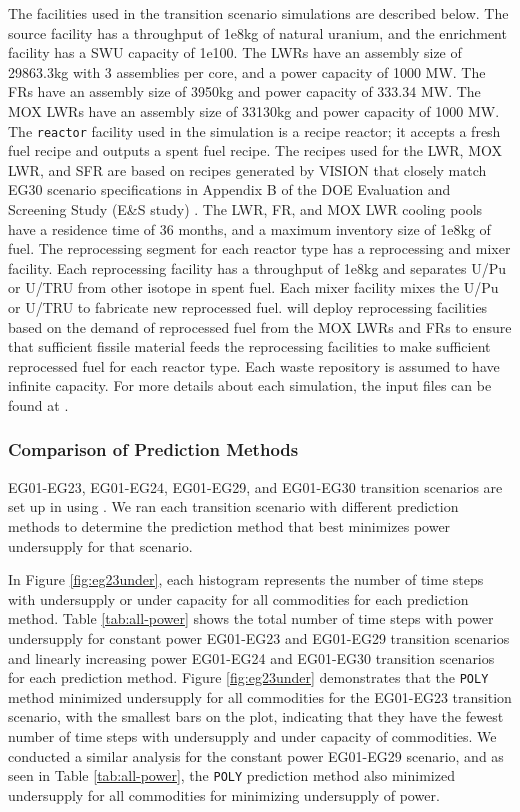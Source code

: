 The facilities used in the transition scenario simulations are described below. 
The source facility has a throughput of 1e8kg of natural uranium, and the enrichment 
facility has a SWU capacity of 1e100. The LWRs have an 
assembly size of 29863.3kg with 3 assemblies per core, and a power capacity of 1000 MW. 
The FRs have an assembly size  of 3950kg and power capacity of 333.34 MW.
The MOX LWRs have an assembly size of 33130kg and power capacity of 1000 MW. 
The \texttt{reactor} facility used in the \Cyclus simulation 
is a recipe reactor; it accepts a fresh fuel recipe and outputs 
a spent fuel recipe. 
The recipes used for the \gls{LWR}, \gls{MOX} \gls{LWR}, and 
\gls{SFR} are based on recipes generated by VISION 
\cite{bae_arfctransition-scenarios_2019}
that closely match EG30 scenario specifications in 
Appendix B of the \gls{DOE} Evaluation and Screening Study 
(E\&S study) \cite{wigeland_nuclear_2014}. 
The LWR, FR, and MOX LWR cooling pools have a residence time of 36 months, and a maximum 
inventory size of 1e8kg of fuel. 
The reprocessing segment for each reactor type has a reprocessing and mixer facility. 
Each reprocessing facility has a throughput of 1e8kg and separates U/Pu or U/TRU from 
other isotope in spent fuel. 
Each mixer facility mixes the U/Pu or U/TRU to fabricate new reprocessed fuel.  
\deploy will deploy reprocessing facilities based on the demand of reprocessed fuel 
from the MOX LWRs and FRs to ensure that sufficient fissile material 
feeds the reprocessing facilities to make sufficient reprocessed fuel 
for each reactor type. 
Each waste repository is assumed to have infinite capacity. 
For more details about each simulation, the input files can be found at 
\cite{bae_arfctransition-scenarios_2019}. 


\subsubsection{Comparison of Prediction Methods}
\label{sec:complex1}
EG01-EG23, EG01-EG24, EG01-EG29, and EG01-EG30 transition scenarios
are set up in \Cyclus using \deploy. 
We ran each transition scenario with different prediction 
methods to determine the prediction method that best minimizes 
power undersupply for that scenario. 

In Figure \ref{fig:eg23under}, each histogram represents 
the number of time steps with undersupply or 
under capacity for all commodities for each prediction method.  
Table \ref{tab:all-power} shows the total number of time steps with power 
undersupply for constant power EG01-EG23 and EG01-EG29 transition scenarios and
linearly increasing power EG01-EG24 and EG01-EG30 transition scenarios
for each prediction method. 
Figure \ref{fig:eg23under} demonstrates that the \texttt{POLY} method
minimized undersupply for all commodities for the EG01-EG23 transition scenario,
with the smallest bars on the plot, indicating that they have the 
fewest number of time steps with undersupply and under capacity
of commodities. 
We conducted a similar analysis for the constant power EG01-EG29 scenario,
and as seen in Table \ref{tab:all-power}, the \texttt{POLY} prediction method 
also minimized undersupply for all commodities for minimizing undersupply of power.  

